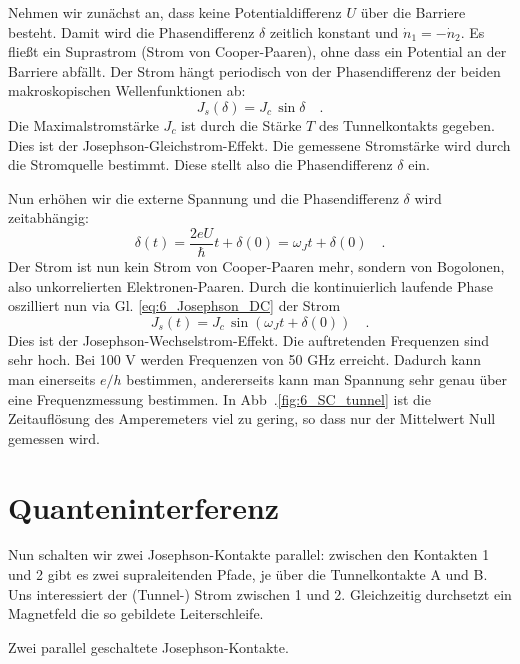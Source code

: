 Nehmen wir zunächst an, dass keine Potentialdifferenz $U$ über die Barriere besteht. Damit wird die Phasendifferenz $\delta$ zeitlich konstant und $ \dot{n}_1 = - \dot{n}_2$. Es fließt ein Suprastrom (Strom von Cooper-Paaren), ohne dass ein Potential an der Barriere abfällt. Der Strom hängt periodisch von der Phasendifferenz der beiden makroskopischen Wellenfunktionen ab:
\begin{equation}
    J_s(\delta) = J_c \, \sin \delta \quad . \label{eq:6_Josephson_DC}
\end{equation}
Die Maximalstromstärke $J_c$ ist durch die  Stärke $T$ des Tunnelkontakts gegeben. Dies ist der Josephson-Gleichstrom-Effekt. Die gemessene Stromstärke wird durch die Stromquelle bestimmt. Diese stellt also die Phasendifferenz $\delta$ ein.



Nun erhöhen wir die externe Spannung und die Phasendifferenz $\delta$ wird zeitabhängig:
\begin{equation}
    \delta(t) = \frac{2eU}{\hbar} t + \delta(0)  = \omega_J t +  \delta(0)  \quad .
\end{equation}
Der Strom ist nun kein Strom von Cooper-Paaren mehr, sondern von Bogolonen, also unkorrelierten Elektronen-Paaren. Durch die kontinuierlich laufende Phase oszilliert nun via Gl. \ref{eq:6_Josephson_DC} der Strom
\begin{equation}
    J_s(t) = J_c \, \sin  ( \omega_J t +  \delta(0) ) \quad .
\end{equation}
Dies ist der Josephson-Wechselstrom-Effekt. Die auftretenden Frequenzen sind sehr hoch. Bei 100 \textmu V werden Frequenzen von 50 GHz erreicht. Dadurch kann man einerseits $e/h$ bestimmen, andererseits kann man Spannung sehr genau über eine Frequenzmessung bestimmen. In Abb~.\ref{fig:6_SC_tunnel} ist die Zeitauflösung des Amperemeters viel zu gering, so dass nur der Mittelwert Null gemessen wird.


\section*{Quanteninterferenz}


Nun schalten wir zwei Josephson-Kontakte parallel: zwischen den Kontakten 1 und 2 gibt es zwei supraleitenden Pfade, je über die Tunnelkontakte A und B. Uns interessiert der (Tunnel-) Strom zwischen 1 und 2. Gleichzeitig durchsetzt ein Magnetfeld die so gebildete Leiterschleife.

\begin{marginfigure}
    \caption{Zwei parallel geschaltete Josephson-Kontakte.}
\end{marginfigure}


